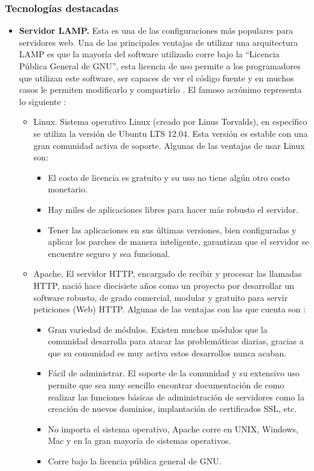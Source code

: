\subsubsection{Tecnologías destacadas}

\begin{itemize}
	\item \textbf{Servidor LAMP.} Esta es una de las configuraciones más populares para servidores web. 
		Una de las principales ventajas de utilizar una arquitectura LAMP es que la mayoría del software utilizado corre bajo la ``Licencia Pública General de GNU'', esta licencia de uso permite a los programadores que utilizan este software, ser capaces de ver el código fuente y en muchos casos le permiten modificarlo y compartirlo \cite{lozano2008software}.
	El famoso acrónimo representa lo siguiente :
	\begin{itemize}
		\item Linux. Sistema operativo Linux (creado por Linus Torvalds), en específico se utiliza la versión de Ubuntu LTS 12.04. Esta versión es estable con una gran comunidad activa de soporte. Algunas de las ventajas de usar Linux son:
		\begin{itemize}
			\item El costo de licencia es gratuito y su uso no tiene algún otro costo monetario.
			\item Hay miles de aplicaciones libres para hacer más robusto el servidor.
			\item Tener las aplicaciones en sus últimas versiones, bien configuradas y aplicar los parches de manera inteligente, garantizan que el servidor se encuentre seguro y sea funcional.
		\end{itemize}
		\item Apache. El servidor HTTP, encargado de recibir y procesar las llamadas HTTP, nació hace diecisiete años como un proyecto por desarrollar un software robusto, de grado comercial, modular y gratuito para servir peticiones (Web) HTTP. Algunas de las ventajas con las que cuenta son \cite{apacheWeb}:
		\begin{itemize}
			\item Gran variedad de módulos. Existen muchos módulos que la comunidad desarrolla para atacar las problemáticas diarias, gracias a que su comunidad es muy activa estos desarrollos nunca acaban.
			\item Fácil de administrar. El soporte de la comunidad y su extensivo uso permite que sea muy sencillo encontrar documentación de como realizar las funciones básicas de administración de servidores como la creación de nuevos dominios, implantación de certificados SSL, etc.
			\item No importa el sistema operativo, Apache corre en UNIX, Windows, Mac y en la gran mayoría de sistemas operativos.
			\item Corre bajo la licencia pública general de GNU.
		\end{itemize}


\end{itemize}
\end{itemize}
